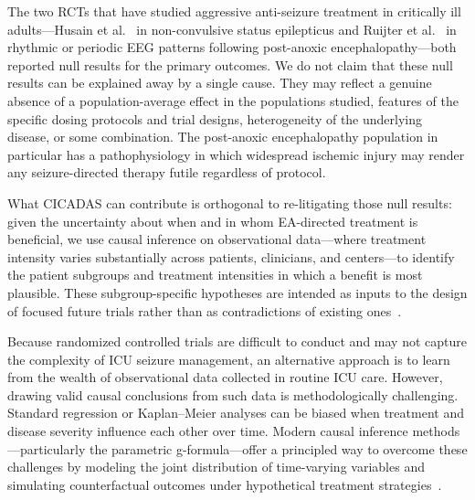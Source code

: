 The two RCTs that have studied aggressive anti-seizure treatment in critically ill adults---Husain et al.~\cite{husain2018randomized} in non-convulsive status epilepticus and Ruijter et al.~\cite{ruijter2022treating} in rhythmic or periodic EEG patterns following post-anoxic encephalopathy---both reported null results for the primary outcomes. We do not claim that these null results can be explained away by a single cause. They may reflect a genuine absence of a population-average effect in the populations studied, features of the specific dosing protocols and trial designs, heterogeneity of the underlying disease, or some combination. The post-anoxic encephalopathy population in particular has a pathophysiology in which widespread ischemic injury may render any seizure-directed therapy futile regardless of protocol.

What CICADAS can contribute is orthogonal to re-litigating those null results: given the uncertainty about when and in whom EA-directed treatment is beneficial, we use causal inference on observational data---where treatment intensity varies substantially across patients, clinicians, and centers---to identify the patient subgroups and treatment intensities in which a benefit is most plausible. These subgroup-specific hypotheses are intended as inputs to the design of focused future trials rather than as contradictions of existing ones~\cite{parikh2024many}.

Because randomized controlled trials are difficult to conduct and may not capture the complexity of ICU seizure management, an alternative approach is to learn from the wealth of observational data collected in routine ICU care. However, drawing valid causal conclusions from such data is methodologically challenging. Standard regression or Kaplan–Meier analyses can be biased when treatment and disease severity influence each other over time. Modern causal inference methods—particularly the parametric g-formula—offer a principled way to overcome these challenges by modeling the joint distribution of time-varying variables and simulating counterfactual outcomes under hypothetical treatment strategies~\cite{hernan2016using, hernan2020causal, parikh2024many}.

